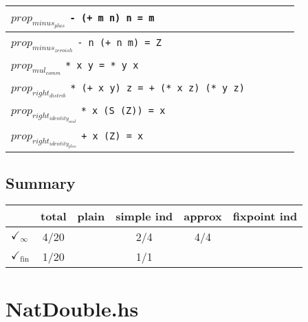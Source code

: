 \documentclass{article}
\begin{document}
\begin{longtable}{p{10cm} || c | c | c | c | }
\hline
$prop_{minus_{plus}}$ \newline \verb`- (+ m n) n = m` &  &  &  &  \\
\hline
$prop_{minus_{zeroish}}$ \newline \verb`- n (+ n m) = Z` &  &  &  &  \\
\hline
$prop_{mul_{comm}}$ \newline \verb`* x y = * y x` &  &  &  &  \\
\hline
$prop_{right_{distrib}}$ \newline \verb`* (+ x y) z = + (* x z) (* y z)` &  &  &  &  \\
\hline
$prop_{right_{identity_{mul}}}$ \newline \verb`* x (S (Z)) = x` &  &  &  &  \\
\hline
$prop_{right_{identity_{plus}}}$ \newline \verb`+ x (Z) = x` &  &  &  &  \\
\end{longtable}

\subsection*{Summary}
\begin{longtable}{p{4cm} || c | c | c | c | c | }
  & total & plain & simple ind & approx & fixpoint ind \\
\hline
$\checkmark_{\infty}$ & 4/20 &  & 2/4 & 4/4 & \\
\hline
$\checkmark_{\mathrm{fin}}$ & 1/20 &  & 1/1 &  & \\
\end{longtable}

\section*{NatDouble.hs}
\end{document}
